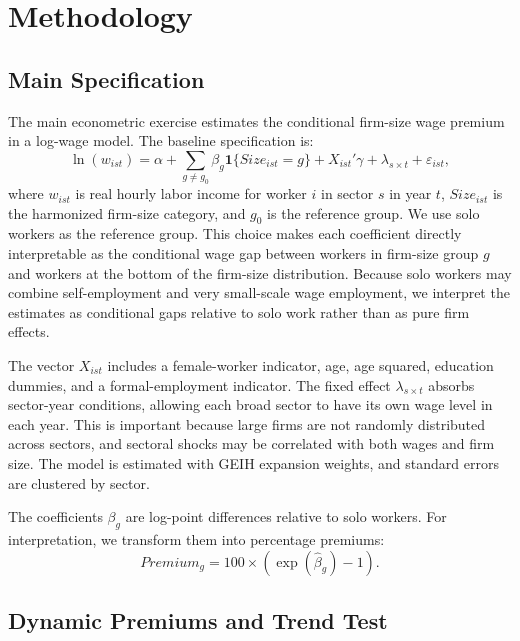 \section{Methodology}

\subsection{Main Specification}

The main econometric exercise estimates the conditional firm-size wage premium in a log-wage model. The baseline specification is:
\begin{equation}\label{eq:main}
  \ln(w_{ist}) =
  \alpha
  + \sum_{g \neq g_0} \beta_g \mathbf{1}\{Size_{ist}=g\}
  + X_{ist}'\gamma
  + \lambda_{s \times t}
  + \varepsilon_{ist},    
\end{equation}
where \(w_{ist}\) is real hourly labor income for worker \(i\) in sector \(s\) in year \(t\), \(Size_{ist}\) is the harmonized firm-size category, and \(g_0\) is the reference group. We use solo workers as the reference group. This choice makes each coefficient directly interpretable as the conditional wage gap between workers in firm-size group \(g\) and workers at the bottom of the firm-size distribution. Because solo workers may combine self-employment and very small-scale wage employment, we interpret the estimates as conditional gaps relative to solo work rather than as pure firm effects.

The vector \(X_{ist}\) includes a female-worker indicator, age, age squared, education dummies, and a formal-employment indicator. The fixed effect \(\lambda_{s \times t}\) absorbs sector-year conditions, allowing each broad sector to have its own wage level in each year. This is important because large firms are not randomly distributed across sectors, and sectoral shocks may be correlated with both wages and firm size. The model is estimated with GEIH expansion weights, and standard errors are clustered by sector.

The coefficients \(\beta_g\) are log-point differences relative to solo workers. For interpretation, we transform them into percentage premiums:
\begin{equation}
  Premium_g = 100 \times \left(\exp(\hat{\beta}_g)-1\right).    
\end{equation}

\subsection{Dynamic Premiums and Trend Test}

